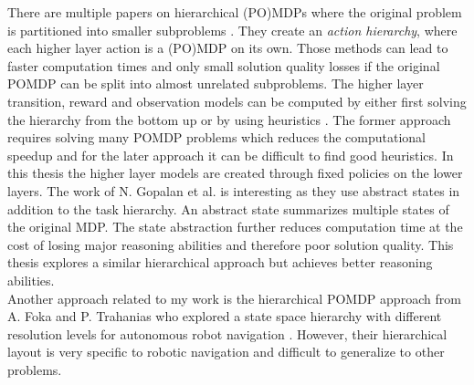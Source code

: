 There are multiple papers on hierarchical (PO)MDPs where the original problem is partitioned into smaller subproblems \cite{Pineau02anintegrated, rmax, Gopalan2017PlanningWA}.  They create an \textit{action hierarchy}, where each higher layer action is a (PO)MDP on its own. Those methods can lead to faster computation times and only small solution quality losses if the original POMDP can be split into almost unrelated subproblems. The higher layer transition, reward and observation models can be computed by either first solving the hierarchy from the bottom up \cite{Pineau02anintegrated, rmax} or by using heuristics \cite{Gopalan2017PlanningWA}. The former approach requires solving many POMDP problems which reduces the computational speedup and for the later approach it can be difficult to find good heuristics. In this thesis the higher layer models are created through fixed policies on the lower layers. The work of N. Gopalan et al. \cite{Gopalan2017PlanningWA} is interesting as they use abstract states in addition to the task hierarchy. An abstract state summarizes multiple states of the original MDP. The state abstraction further reduces computation time at the cost of losing major reasoning abilities and therefore poor solution quality. This thesis explores a similar hierarchical approach but achieves better reasoning abilities.\\
Another approach related to my work is the hierarchical POMDP approach from A. Foka and P. Trahanias who explored a state space hierarchy with different resolution levels for autonomous robot navigation \cite{FOKA2007561}. However, their hierarchical layout is very specific to robotic navigation and difficult to generalize to other problems. 
